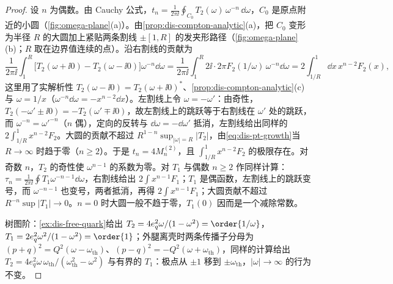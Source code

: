\begin{proof}
设 $n$ 为偶数。由 Cauchy 公式，$t_n=\frac1{2\pi\ii}\oint_{C_0}T_2(\omega)\,\omega^{-n}\,\dd\omega$，$C_0$ 是原点附近的小圆（\cref{fig:omega-plane}(a)）。由\cref{prop:dis-compton-analytic}(a)，把 $C_0$ 变形为半径 $R$ 的大圆加上紧贴两条割线 $\pm[1,R]$ 的发夹形路径（\cref{fig:omega-plane}(b)；$R$ 取在边界值连续的点）。沿右割线的贡献为
\[
\frac1{2\pi\ii}\int_1^R\Big[T_2(\omega+\ii0)-T_2(\omega-\ii0)\Big]\omega^{-n}\dd\omega
=\frac1{2\pi\ii}\int_1^R2\ii\cdot2\pi F_2(1/\omega)\,\omega^{-n}\dd\omega=2\int_{1/R}^1\dd x\,x^{n-2}F_2(x),
\]
这里用了实解析性 $T_2(\omega-\ii0)=T_2(\omega+\ii0)^*$、\cref{prop:dis-compton-analytic}(c) 与 $\omega=1/x$（$\omega^{-n}\dd\omega=-x^{n-2}\dd x$）。左割线上令 $\omega=-\omega'$：由奇性，$T_2(-\omega'\pm\ii0)=-T_2(\omega'\mp\ii0)$，故左割线上的跳跃等于右割线在 $\omega'$ 处的跳跃，而 $\omega^{-n}=\omega'^{-n}$（$n$ 偶），定向的反转与 $\dd\omega=-\dd\omega'$ 抵消，左割线给出同样的 $2\int_{1/R}^1x^{n-2}F_2$。大圆的贡献不超过 $R^{1-n}\sup_{|\omega|=R}|T_2|$，由\cref{eq:dis-pt-growth}当 $R\to\infty$ 时趋于零（$n\ge2$）。于是 $t_n=4M^{(2)}_n$，且 $\int_{1/R}^1x^{n-2}F_2$ 的极限存在。对奇数 $n$，$T_2$ 的奇性使 $\omega^{n-1}$ 的系数为零。对 $T_1$ 与偶数 $n\ge2$ 作同样计算：$\tau_n=\frac1{2\pi\ii}\oint T_1\omega^{-n-1}\dd\omega$，右割线给出 $2\int x^{n-1}F_1$；$T_1$ 是偶函数，左割线上的跳跃变号，而 $\omega^{-n-1}$ 也变号，两者抵消，再得 $2\int x^{n-1}F_1$；大圆贡献不超过 $R^{-n}\sup|T_1|\to0$。$n=0$ 时大圆一般不趋于零，$T_1(0)$ 因而是一个减除常数。

树图阶：\cref{ex:dis-free-quark}给出 $T_2=4e_q^2\omega/(1-\omega^2)=\order{1/\omega}$，$T_1=2e_q^2\omega^2/(1-\omega^2)=\order{1}$；外腿离壳时两条传播子分母为 $(p+q)^2=Q^2(\omega-\omega_{\mathrm{th}})$、$(p-q)^2=-Q^2(\omega+\omega_{\mathrm{th}})$，同样的计算给出 $T_2=4e_q^2\omega\,\omega_{\mathrm{th}}/(\omega_{\mathrm{th}}^2-\omega^2)$ 与有界的 $T_1$：极点从 $\pm1$ 移到 $\pm\omega_{\mathrm{th}}$，$|\omega|\to\infty$ 的行为不变。
\end{proof}

